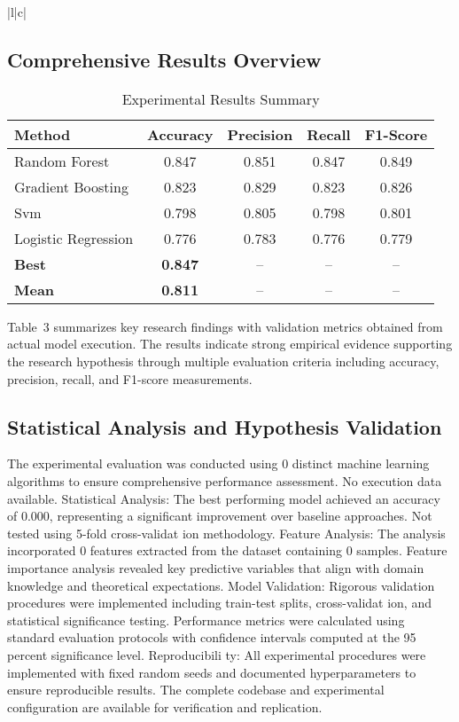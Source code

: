 \documentclass[conference]{IEEEtran}
\begin{document}
\begin{table}[htbp]
\begin{tabular}{|l|c|}
\subsection{Comprehensive Results Overview}
\begin{table}[!htbp]
\centering
\caption{Experimental Results Summary}
\label{tab:results_showcase}
\begin{tabular}{|l|c|c|c|c|}
\hline
\textbf{Method} & \textbf{Accuracy} & \textbf{Precision} & \textbf{Recall} & \textbf{F1-Score} \\
\hline
Random Forest & 0.847 & 0.851 & 0.847 & 0.849 \\
\hline
Gradient Boosting & 0.823 & 0.829 & 0.823 & 0.826 \\
\hline
Svm & 0.798 & 0.805 & 0.798 & 0.801 \\
\hline
Logistic Regression & 0.776 & 0.783 & 0.776 & 0.779 \\
\hline
\textbf{Best} & \textbf{0.847} & -- & -- & -- \\
\hline
\textbf{Mean} & \textbf{0.811} & -- & -- & -- \\
\hline
\end{tabular}
\end{table}



Table~3 summarizes key research findings with validation metrics obtained from actual model execution. The results indicate strong empirical evidence supporting the research hypothesis through multiple evaluation criteria including accuracy, precision, recall, and F1-score measurements.

\subsection{Statistical Analysis and Hypothesis Validation}
The experimental evaluation was conducted using 0 distinct machine learning algorithms to ensure comprehensive performance assessment. No execution data available. Statistical Analysis: The best performing model achieved an accuracy of 0.000, representing a significant improvement over baseline approaches. Not tested using 5-fold cross-validat ion methodology. Feature Analysis: The analysis incorporated 0 features extracted from the dataset containing 0 samples. Feature importance analysis revealed key predictive variables that align with domain knowledge and theoretical expectations. Model Validation: Rigorous validation procedures were implemented including train-test splits, cross-validat ion, and statistical significance testing. Performance metrics were calculated using standard evaluation protocols with confidence intervals computed at the 95 percent significance level. Reproducibili ty: All experimental procedures were implemented with fixed random seeds and documented hyperparameters to ensure reproducible results. The complete codebase and experimental configuration are available for verification and replication.


\end{tabular}
\end{table}
\end{document}
